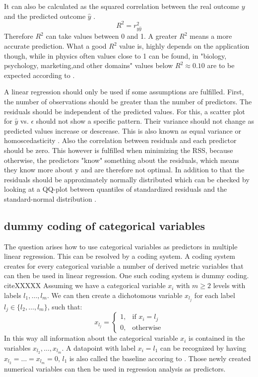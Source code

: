 \documentclass[12 pt]{scrartcl}
\begin{document}
It can also be calculated as the squared correlation between the real outcome $y$ and the predicted outcome $\hat{y}$ \citep[p.~113]{fahrmeir2013regression}.
\[ R^2 =  r_{y\hat{y}}^2\]
Therefore $R^2$ can take values between 0 and 1. A greater $R^2$ means a more accurate prediction. What a good $R^2$ value is, highly depends on the application though, while in physics often values close to 1 can be found, in "biology, psychology, marketing,and other domains" values below $R^2 \approx 0.10$ are to be expected according to \citet[p.~70]{james2013introduction}.

A linear regression should only be used if some assumptions are fulfilled. First, the number of observations should be greater than the number of predictors. The residuals should be independent of the predicted values. For this, a scatter plot for $\hat{y}$ vs. $\epsilon$ should not show a specific pattern. Their variance should not change as predicted values increase or descrease. This is also known as equal variance or homoscedasticity \citep{Prabhakaran}. Also the correlation between residuals and each predictor should be zero. This however is fulfilled when minimizing the RSS, because otherwise, the predictors "know" something about the residuals, which means they know more about y and are therefore not optimal. In addition to that the residuals should be approximately normally distributed which can be checked by looking at a QQ-plot between quantiles of standardized residuals and the standard-normal distribution \citep{Prabhakaran}.

\subsection{dummy coding of categorical variables}
The question arises how to use categorical variables as predictors in multiple linear regression. This can be resolved by a coding system. A coding system creates for every categorical variable a number of derived metric variables that can then be used in linear regression. One such coding system is dummy coding. citeXXXXX
Assuming we have a categorical variable $x_i$ with $m \ge 2$ levels with labels $l_1, \dots, l_m$. We can then create a dichotomous variable $x_{l_j}$ for each label $l_j \in\{l_2, \dots, l_m\}$, such that:
\[
  x_{l_j}=
  \begin{cases}
    1, & \text{if } x_i = l_j \\
    0, & \text{otherwise}
  \end{cases}
\]
In this way all information about the categorical variable $x_i$ is contained in the variables $x_{l_2}, \dots, x_{l_m}$. A datapoint with label $x_i = l_1$ can be recognized by having $x_{l_2} = \dots = x_{l_m} = 0$, $l_1$ is also called the baseline accoring to \citet[p.~86]{james2013introduction}. Those newly created numerical variables can then be used in regression analysis as predictors.
\end{document}
